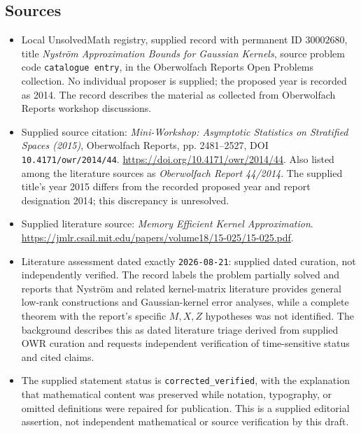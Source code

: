 \documentclass[11pt]{article}
\begin{document}
\subsection{Sources}
\begin{itemize}
\item Local UnsolvedMath registry, supplied record with permanent ID \(30002680\), title \emph{Nystr\"om Approximation Bounds for Gaussian Kernels}, source problem code \texttt{catalogue entry}, in the Oberwolfach Reports Open Problems collection. No individual proposer is supplied; the proposed year is recorded as 2014. The record describes the material as collected from Oberwolfach Reports workshop discussions.
\item Supplied source citation: \emph{Mini-Workshop: Asymptotic Statistics on Stratified Spaces (2015)}, Oberwolfach Reports, pp. 2481--2527, DOI \texttt{10.4171/owr/2014/44}. \url{https://doi.org/10.4171/owr/2014/44}. Also listed among the literature sources as \emph{Oberwolfach Report 44/2014}. The supplied title's year 2015 differs from the recorded proposed year and report designation 2014; this discrepancy is unresolved.
\item Supplied literature source: \emph{Memory Efficient Kernel Approximation}. \url{https://jmlr.csail.mit.edu/papers/volume18/15-025/15-025.pdf}.
\item Literature assessment dated exactly \texttt{2026-08-21}: supplied dated curation, not independently verified. The record labels the problem partially solved and reports that Nystr\"om and related kernel-matrix literature provides general low-rank constructions and Gaussian-kernel error analyses, while a complete theorem with the report's specific \(M,X,Z\) hypotheses was not identified. The background describes this as dated literature triage derived from supplied OWR curation and requests independent verification of time-sensitive status and cited claims.
\item The supplied statement status is \texttt{corrected\_verified}, with the explanation that mathematical content was preserved while notation, typography, or omitted definitions were repaired for publication. This is a supplied editorial assertion, not independent mathematical or source verification by this draft.
\end{itemize}
\end{document}

